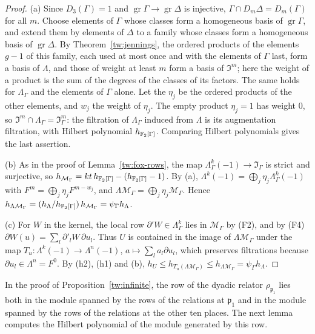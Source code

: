 \begin{proof}
(a) Since $D_3(\Gamma)=1$ and $\operatorname{gr}\Gamma\to\operatorname{gr}\Delta$
is injective, $\Gamma\cap D_m\Delta=D_m(\Gamma)$ for all $m$. Choose elements
of $\Gamma$ whose classes form a homogeneous basis of $\operatorname{gr}\Gamma$,
and extend them by elements of $\Delta$ to a family whose classes form a
homogeneous basis of $\operatorname{gr}\Delta$. By Theorem~\ref{tw:jennings},
the ordered products of the elements $g-1$ of this family, each used at most
once and with the elements of $\Gamma$ last, form a basis of $\Lambda$, and
those of weight at least $m$ form a basis of $\mathfrak I^m$; here the weight
of a product is the sum of the degrees of the classes of its factors. The
same holds for $\Lambda_\Gamma$ and the elements of $\Gamma$ alone. Let the
$\eta_j$ be the ordered products of the other elements, and $w_j$ the weight
of $\eta_j$. The empty product $\eta_j=1$ has weight $0$, so
$\mathfrak I^m\cap\Lambda_\Gamma=\mathfrak I_\Gamma^m$: the filtration of
$\Lambda_\Gamma$ induced from $\Lambda$ is its augmentation filtration, with
Hilbert polynomial $h_{\mathbb F_2[\Gamma]}$. Comparing Hilbert polynomials gives the
last assertion.

(b) As in the proof of Lemma~\ref{tw:fox-rows}, the map
$\Lambda_\Gamma^k(-1)\to\mathfrak I_\Gamma$ is strict and surjective, so
$h_{\mathcal M_\Gamma}=kt\,h_{\mathbb F_2[\Gamma]}-(h_{\mathbb F_2[\Gamma]}-1)$. By (a),
$\Lambda^k(-1)=\bigoplus_j\eta_j\Lambda_\Gamma^k(-1)$ with
$F^m=\bigoplus_j\eta_jF^{m-w_j}$, and
$\Lambda\mathcal M_\Gamma=\bigoplus_j\eta_j\mathcal M_\Gamma$. Hence
$h_{\Lambda\mathcal M_\Gamma}=(h_\Lambda/h_{\mathbb F_2[\Gamma]})\,h_{\mathcal M_\Gamma}=\psi_\Gamma h_\Lambda$.

(c) For $W$ in the kernel, the local row $\partial'W\in\Lambda_\Gamma^k$ lies in
$\mathcal M_\Gamma$ by (F2), and by (F4)
$\partial W(u)=\sum_l\partial'_lW\,\partial u_l$. Thus $U$ is contained in the
image of $\Lambda\mathcal M_\Gamma$ under the map
$T_u\colon\Lambda^k(-1)\to\Lambda^n(-1)$, $a\mapsto\sum_la_l\partial u_l$,
which preserves filtrations because $\partial u_l\in\Lambda^n=F^0$. By (h2),
(h1) and (b),
$h_U\le h_{T_u(\Lambda\mathcal M_\Gamma)}\le h_{\Lambda\mathcal M_\Gamma}=\psi_\Gamma h_\Lambda$.
\end{proof}

In the proof of Proposition~\ref{tw:infinite}, the row of the dyadic relator
$\rho_{\mathfrak p_1}$ lies both in the module spanned by the rows of the
relations at $\mathfrak p_1$ and in the module spanned by the rows of the
relations at the other ten places. The next lemma computes the Hilbert
polynomial of the module generated by this row.

